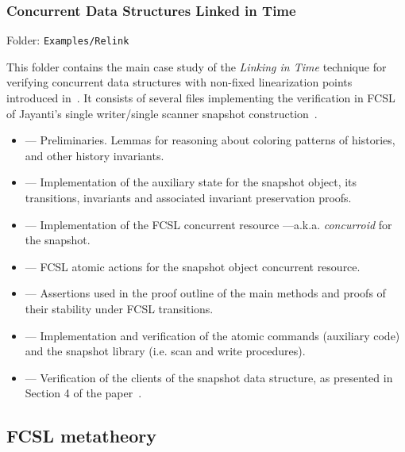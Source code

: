 \subsubsection{Concurrent Data Structures Linked in Time}
\label{sec:relink}

Folder: \texttt{Examples/Relink}

This folder contains the main case study of the {\it Linking in Time}
technique for verifying concurrent data structures with non-fixed
linearization points introduced in~\cite{Delbianco-al:ECOOP17}. It
consists of several files implementing the verification in FCSL of
Jayanti's single writer/single scanner snapshot
construction~\cite{Jayanti+STOC05}.


\begin{itemize}

 \item {} --- Preliminaries. Lemmas for
       reasoning about coloring patterns of histories, and other
       history invariants.

 \item {} --- Implementation of the
 auxiliary state for the snapshot object, its transitions, invariants
 and associated invariant preservation proofs.

 \item {} --- Implementation of the FCSL
 concurrent resource ---a.k.a. {\it concurroid} for the snapshot.

 \item {} --- FCSL atomic actions for the
 snapshot object concurrent resource.

 \item {} --- Assertions used in the proof
 outline of the main methods and proofs of their stability under FCSL
 transitions.

 \item {} --- Implementation and verification
 of the atomic commands (auxiliary code) and the snapshot library
 (i.e. scan and write procedures).

 \item {} --- Verification of the clients of
 the snapshot data structure, as presented in Section 4 of the
 paper~\cite{Delbianco-al:ECOOP17}.

\end{itemize}

\subsection{FCSL metatheory}
\label{sec:fcsl-metatheory}

